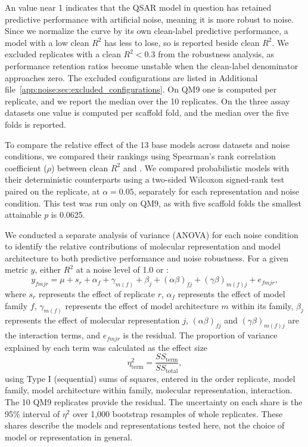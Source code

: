 An \aucnorm{} value near 1 indicates that the QSAR model in question has retained predictive performance with artificial noise, meaning it is more robust to noise. Since we normalize the curve by its own clean-label predictive performance, a model with a low clean $R^2$ has less to lose, so \aucnorm{} is reported beside clean $R^2$. We excluded replicates with a clean $R^2 < 0.3$ from the robustness analysis, as performance retention ratios become unstable when the clean-label denominator approaches zero. The excluded configurations are listed in Additional file~\ref{app:noise:sec:excluded_configurations}. On QM9 one \aucnorm{} is computed per replicate, and we report the median over the 10 replicates. On the three assay datasets one value is computed per scaffold fold, and the median over the five folds is reported. 

To compare the relative effect of the 13 base models across datasets and noise conditions, we compared their rankings using Spearman's rank correlation coefficient ($\rho$) between clean $R^2$ and \aucnorm. We compared probabilistic models with their deterministic counterparts using a two-sided Wilcoxon signed-rank test paired on the replicate, at $\alpha = 0.05$, separately for each representation and noise condition. This test was run only on QM9, as with five scaffold folds the
smallest attainable $p$ is 0.0625.

We conducted a separate analysis of variance (ANOVA) for each noise condition to identify the
relative contributions of molecular representation and model architecture to both predictive
performance and noise robustness. For a given metric $y$, either $R^2$ at a noise level of 1.0 or
\aucnorm:
\begin{equation}
y_{fmjr} = \mu + s_r + \alpha_f + \gamma_{m(f)} + \beta_j + (\alpha\beta)_{fj} + (\gamma\beta)_{m(f)j} + e_{fmjr},
\end{equation}
where $s_r$ represents the effect of replicate $r$, $\alpha_f$ represents the effect of model family $f$, $\gamma_{m(f)}$ represents the effect of model architecture $m$ within its family, $\beta_j$ represents the effect of
molecular representation $j$, $(\alpha\beta)_{fj}$ and $(\gamma\beta)_{m(f)j}$ are the interaction terms, and $e_{fmjr}$ is the
residual. The proportion of variance explained by each term was calculated as the
effect size
\begin{equation}
\eta^2_{\text{term}} = \frac{SS_{\text{term}}}{SS_{\text{total}}},
\end{equation}
using Type I (sequential) sums of squares, entered in the order replicate, model family, model architecture within family, molecular
representation, interaction. The 10 QM9 replicates provide the residual. The uncertainty on each share is the 95\% interval of $\eta^2$ over 1,000 bootstrap resamples of whole replicates. These shares describe the models and representations tested here, not the choice of model or representation in general. 

